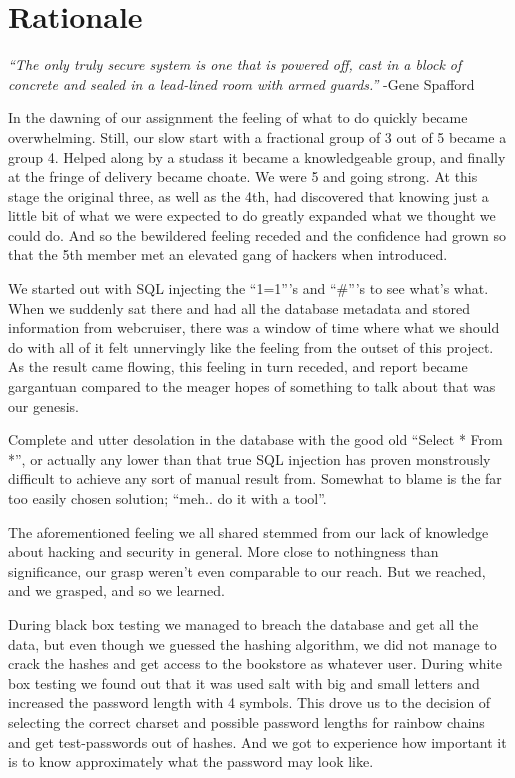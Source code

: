 \clearpage
\section{Rationale}

{\large {\em “The only truly secure system is one that is powered off, cast in a block of concrete and sealed in a lead-lined room with armed guards.”}} -Gene Spafford

In the dawning of our assignment the feeling of what to do quickly became overwhelming. Still, our slow start with a fractional group of 3 out of 5 became a group 4. Helped along by a studass it became a knowledgeable group, and finally at the fringe of delivery became choate. We were 5 and going strong. At this stage the original three, as well as the 4th, had discovered that knowing just a little bit of what we were expected to do greatly expanded what we thought we could do. And so the bewildered feeling receded and the confidence had grown so that the 5th member met an elevated gang of hackers when introduced. 

We started out with SQL injecting the “1=1”’s and “\#”’s to see what’s what. When we suddenly sat there and had all the database metadata and stored information from webcruiser, there was a window of time where what we should do with all of it felt unnervingly like the feeling from the outset of this project.
As the result came flowing, this feeling in turn receded, and report became gargantuan compared to the meager hopes of something to talk about that was our genesis.

Complete and utter desolation in the database with the good old “Select * From *”, or actually any lower than that true SQL injection has proven monstrously difficult to achieve any sort of manual result from. Somewhat to blame is the far too easily chosen solution; “meh.. do it with a tool”. 

The aforementioned feeling we all shared stemmed from our lack of knowledge about hacking and security in general. More close to nothingness than significance, our grasp weren’t even comparable to our reach. But we reached, and we grasped, and so we learned. 

During black box testing we managed to breach the database and get all the data, but even though we guessed the hashing algorithm, we did not manage to crack the hashes and get access to the bookstore as whatever user. During white box testing we found out that it was used salt with big and small letters and increased the password length with 4 symbols. This drove us to the decision of selecting the correct charset and possible password lengths for rainbow chains and get test-passwords out of hashes. And we got to experience how important it is to know approximately what the password may look like.

